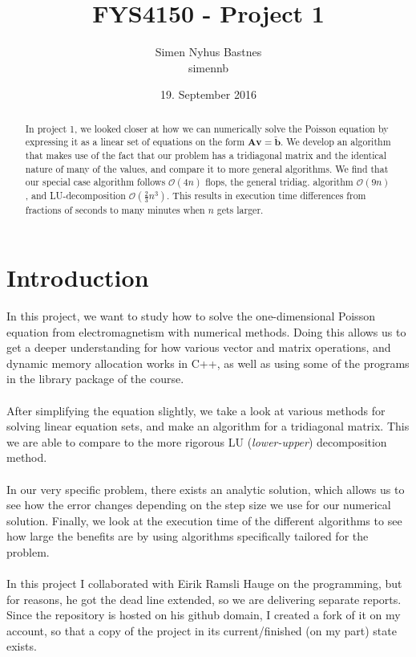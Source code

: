 \documentclass{article}
\title{FYS4150 - Project 1}
\author{Simen Nyhus Bastnes\\simennb}
\date{19. September 2016}
\begin{document}
\maketitle

\begin{abstract}In project 1, we looked closer at how we can numerically solve the Poisson equation by expressing it as a linear set of equations on the form $\mathbf{A}\mathbf{v}=\mathbf{\tilde b}$. We develop an algorithm that makes use of the fact that our problem has a tridiagonal matrix and the identical nature of many of the values, and compare it to more general algorithms. We find that our special case algorithm follows $\mathcal{O}(4n)$ flops, the general tridiag. algorithm $\mathcal{O}(9n)$, and LU-decomposition $\mathcal{O}(\tfrac{2}{3}n^3)$. This results in execution time differences from fractions of seconds to many minutes when $n$ gets larger.
\end{abstract}

\section{Introduction}
In this project, we want to study how to solve the one-dimensional Poisson equation from electromagnetism with numerical methods. Doing this allows us to get a deeper understanding for how various vector and matrix operations, and dynamic memory allocation works in C++, as well as using some of the programs in the library package of the course.\\\\
After simplifying the equation slightly, we take a look at various methods for solving linear equation sets, and make an algorithm for a tridiagonal matrix. This we are able to compare to the more rigorous LU (\textit{lower-upper}) decomposition method.\\\\
In our very specific problem, there exists an analytic solution, which allows us to see how the error changes depending on the step size we use for our numerical solution. Finally, we look at the execution time of the different algorithms to see how large the benefits are by using algorithms specifically tailored for the problem.\\\\
In this project I collaborated with Eirik Ramsli Hauge on the programming, but for reasons, he got the dead line extended, so we are delivering separate reports. Since the repository is hosted on his github domain, I created a fork of it on my account, so that a copy of the project in its current/finished (on my part) state exists.
\end{document}
